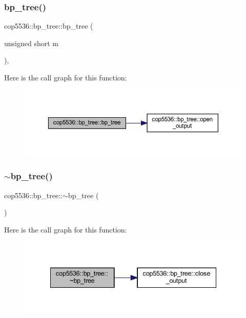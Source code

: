 \mbox{\label{classcop5536_1_1bp__tree_af238ca743991e869f91e940f34da5090}} 
\subsubsection{bp\_tree()\hspace{0.1cm}{\footnotesize\ttfamily [2/2]}}
{\footnotesize\ttfamily cop5536\+::bp\+\_\+tree\+::bp\+\_\+tree (\begin{DoxyParamCaption}\item[{unsigned short}]{m }\end{DoxyParamCaption})\hspace{0.3cm}{\ttfamily [inline]}, {\ttfamily [explicit]}}

Here is the call graph for this function\+:
\nopagebreak
\begin{figure}[H]
\begin{center}
\leavevmode
\includegraphics[width=350pt]{classcop5536_1_1bp__tree_af238ca743991e869f91e940f34da5090_cgraph}
\end{center}
\end{figure}
\mbox{\label{classcop5536_1_1bp__tree_a411c9b8fe2d574fd544c45ab1556f9d5}} 
\subsubsection{$\sim$bp\_tree()}
{\footnotesize\ttfamily cop5536\+::bp\+\_\+tree\+::$\sim$bp\+\_\+tree (\begin{DoxyParamCaption}{ }\end{DoxyParamCaption})\hspace{0.3cm}{\ttfamily [inline]}}

Here is the call graph for this function\+:
\nopagebreak
\begin{figure}[H]
\begin{center}
\leavevmode
\includegraphics[width=335pt]{classcop5536_1_1bp__tree_a411c9b8fe2d574fd544c45ab1556f9d5_cgraph}
\end{center}
\end{figure}


